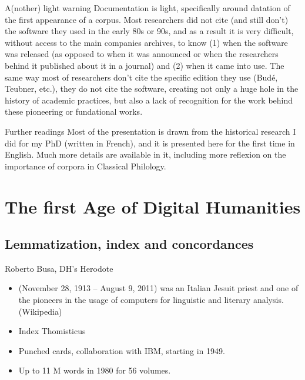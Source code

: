 \documentclass[aspectratio=169]{beamer}
\begin{document}
\begin{frame}{A(nother) light warning}
    Documentation is light, specifically around datation of the first appearance of a corpus. Most researchers did not cite (and still don't) the software they used in the early 80s or 90s, and as a result it is very difficult, without access to the main companies archives, to know (1) when the software was released (as opposed to when it was announced or when the researchers behind it published about it in a journal) and (2) when it came into use. 
    The same way most of researchers don't cite the specific edition they use (Budé, Teubner, etc.), they do not cite the software, creating not only a huge hole in the history of academic practices, but also a lack of recognition for the work behind these pioneering or fundational works.
\end{frame}

\begin{frame}{Further readings}
    Most of the presentation is drawn from the historical research I did for my PhD (written in French), and it is presented here for the first time in English. Much more details are available in it, including more reflexion on the importance of corpora in Classical Philology.
\end{frame}


\section{The first Age of Digital Humanities}

\subsection{Lemmatization, index and concordances}

\begin{frame}{Roberto Busa, DH's Herodote}
    \begin{itemize}
    \item  (November 28, 1913 – August 9, 2011) was an Italian Jesuit priest and one of the pioneers in the usage of computers for linguistic and literary analysis. (Wikipedia)
    \item Index Thomisticus
    \item Punched cards, collaboration with IBM, starting in 1949.
    \item Up to 11 M words in 1980 for 56 volumes.        
    \end{itemize}
\end{frame}
\end{document}
